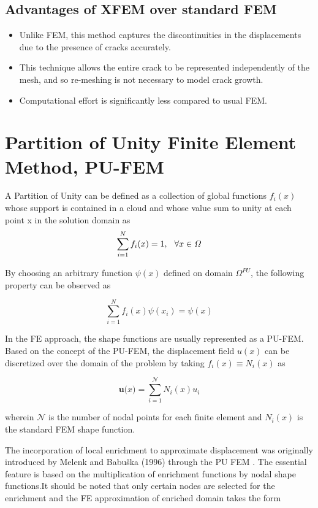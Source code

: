 \documentclass[fleqn, 12.5pt,a4paper]{report}
\begin{document}
\subsection{\color{Black} {Advantages of XFEM over standard FEM}}
\begin{itemize}
    \item Unlike FEM, this method captures the discontinuities in the displacements due to the presence of cracks accurately\cite{khoei2014extended}.
    \item This technique allows the entire crack to be represented independently of the mesh, and so re-meshing is not necessary to model crack growth\cite{khoei2014extended}.
    \item Computational effort is significantly less compared to usual FEM.
\end{itemize}

\section{\color{Black} \large{Partition of Unity Finite Element Method, PU-FEM}}  
A Partition of Unity can be defined as a collection of global functions $f_i(x)$ whose support is contained in a cloud and whose value sum to unity at each point x in the solution domain as \cite{ahmed2009extended}
$$\sum_{i=1}^N f_i(x) = 1, \hspace{0.25cm} \forall {x\in \Omega} $$ 

By choosing an arbitrary function $\psi(x)$ defined on domain $\Omega^{PU}$, the following property can be observed as\cite{khoei2014extended}

$$\sum_{i=1}^N f_i(x) \psi(x_i) = \psi(x)$$

In the FE approach, the shape functions are usually represented as a PU-FEM. Based on the concept of the PU-FEM, the displacement field $u(x)$ can be discretized over the domain of the problem \cite{khoei2014extended} by taking $f_i(x) \equiv N_i(x)$ as

$$\textbf{u($x$)} = \sum_{i=1}^{\mathscr{N}} N_i(x) u_i$$

wherein ${\mathscr{N}}$ is the number of nodal points for each finite element and $N_i(x)$ is the standard FEM shape function.

The incorporation of local enrichment to approximate displacement was originally introduced by Melenk and Babuška (1996) through the PU FEM \cite{ahmed2009extended}. The essential feature is based on the multiplication of enrichment functions by nodal shape functions\cite{ahmed2009extended}.It should be noted that only certain nodes are selected for the enrichment and the FE approximation of enriched domain takes the form
\end{document}
